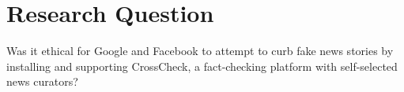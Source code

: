 
\section{Research Question}

Was it ethical for Google and Facebook to attempt to curb fake news stories by installing and supporting CrossCheck, a fact-checking platform with self-selected news curators?